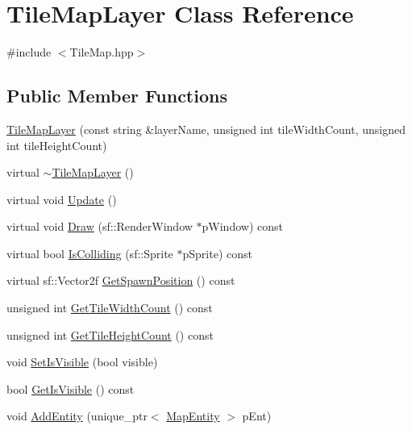 \hypertarget{class_tile_map_layer}{\section{Tile\-Map\-Layer Class Reference}
\label{class_tile_map_layer}
}


{\ttfamily \#include $<$Tile\-Map.\-hpp$>$}

\subsection*{Public Member Functions}
\begin{DoxyCompactItemize}
\item 
\hyperlink{class_tile_map_layer_ac9fba07c129ad2a52be1601f58eee773}{Tile\-Map\-Layer} (const string \&layer\-Name, unsigned int tile\-Width\-Count, unsigned int tile\-Height\-Count)
\item 
virtual \hyperlink{class_tile_map_layer_a8bee35e5252ed1c3c1ea6935003c5d10}{$\sim$\-Tile\-Map\-Layer} ()
\item 
virtual void \hyperlink{class_tile_map_layer_a1befe86a2d2bed2d410924875eca4847}{Update} ()
\item 
virtual void \hyperlink{class_tile_map_layer_ab09044152ad8bebc2afbe837858ac4ae}{Draw} (sf\-::\-Render\-Window $\ast$p\-Window) const 
\item 
virtual bool \hyperlink{class_tile_map_layer_af6140d8910838621911ee1aaefcf317e}{Is\-Colliding} (sf\-::\-Sprite $\ast$p\-Sprite) const 
\item 
virtual sf\-::\-Vector2f \hyperlink{class_tile_map_layer_a04a978cd751d8c67f483816827888c21}{Get\-Spawn\-Position} () const 
\item 
unsigned int \hyperlink{class_tile_map_layer_ace19c01d1db3ebd4d1d370a6b34a2db5}{Get\-Tile\-Width\-Count} () const 
\item 
unsigned int \hyperlink{class_tile_map_layer_a14fce828daafd9e07f855ad0bb274299}{Get\-Tile\-Height\-Count} () const 
\item 
void \hyperlink{class_tile_map_layer_add757a7c1952dc4e0b6cf67e2887b509}{Set\-Is\-Visible} (bool visible)
\item 
bool \hyperlink{class_tile_map_layer_a068d3fa1c63e2c78ec0feb41a441e63c}{Get\-Is\-Visible} () const 
\item 
void \hyperlink{class_tile_map_layer_a7a1e6fc535c544905cd5e96adbc0813a}{Add\-Entity} (unique\-\_\-ptr$<$ \hyperlink{class_map_entity}{Map\-Entity} $>$ p\-Ent)
\end{DoxyCompactItemize}
